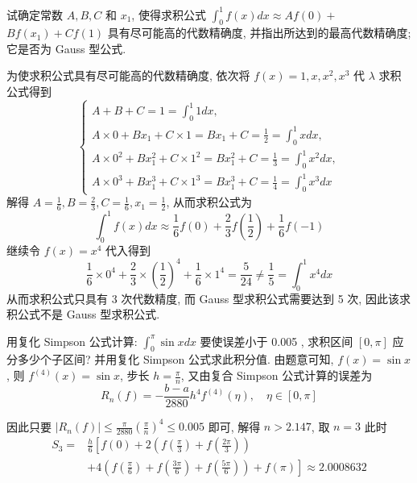  \begin{tcolorbox}[enhanced,colback=10,colframe=9,breakable,coltitle=green!25!black,title=2024]
试确定常数 $ A, B, C $ 和 $ x_{1} $, 使得求积公式 $\displaystyle \int_{0}^{1} f(x) d x \approx A f(0)+ $ $ B f\left(x_{1}\right)+C f(1) $ 具有尽可能高的代数精确度, 并指出所达到的最高代数精确度;它是否为 Gauss 型公式.
\tcblower

 为使求积公式具有尽可能高的代数精确度, 依次将 $ f(x)=1, x, x^{2}, x^{3} $ 代 $ \lambda $ 求积公式得到
$$
\left\{\begin{array}{l}
A+B+C=1=\int_{0}^{1} 1 d x, \\
A \times 0+B x_{1}+C \times 1=B x_{1}+C=\frac{1}{2}=\int_{0}^{1} x d x, \\
A \times 0^{2}+B x_{1}^{2}+C \times 1^{2}=B x_{1}^{2}+C=\frac{1}{3}=\int_{0}^{1} x^{2} d x, \\
A \times 0^{3}+B x_{1}^{3}+C \times 1^{3}=B x_{1}^{3}+C=\frac{1}{4}=\int_{0}^{1} x^{3} d x
\end{array}\right.
$$
解得 $ A=\frac{1}{6}, B=\frac{2}{3}, C=\frac{1}{6}, x_{1}=\frac{1}{2} $, 从而求积公式为
$$
\int_{0}^{1} f(x) d x \approx \frac{1}{6} f(0)+\frac{2}{3} f\left(\frac{1}{2}\right)+\frac{1}{6} f(-1)
$$
继续令 $ f(x)=x^{4} $ 代入得到
$$
\frac{1}{6} \times 0^{4}+\frac{2}{3} \times\left(\frac{1}{2}\right)^{4}+\frac{1}{6} \times 1^{4}=\frac{5}{24} \neq \frac{1}{5}=\int_{0}^{1} x^{4} d x 
$$
从而求积公式只具有 3 次代数精度, 而 Gauss 型求积公式需要达到 5 次, 因此该求积公式不是 Gauss 型求积公式.

\end{tcolorbox}

 
\begin{tcolorbox}[enhanced,colback=10,colframe=9,breakable,coltitle=green!25!black,title=2024]
 用复化 Simpson 公式计算: $\displaystyle \int_{0}^{\pi} \sin x d x $ 要使误差小于 0.005 , 求积区间 $ [0, \pi] $ 应分多少个子区间? 并用复化 Simpson 公式求此积分值.
\tcblower
 由题意可知, $ f(x)=\sin x $, 则 $ f^{(4)}(x)=\sin x $, 步长 $ h=\frac{\pi}{n} $, 又由复合 Simpson 公式计算的误差为
$$
R_{n}(f)=-\frac{b-a}{2880} h^{4} f^{(4)}(\eta), \quad \eta \in[0, \pi]
$$

因此只要 $ \left|R_{n}(f)\right| \leqslant \frac{\pi}{2880}\left(\frac{\pi}{n}\right)^{4} \leqslant 0.005 $ 即可, 解得 $ n>2.147 $, 取 $ n=3 $ 此时
$$
\begin{aligned}
S_{3}= & \frac{h}{6}\left[f(0)+2\left(f\left(\frac{\pi}{3}\right)+f\left(\frac{2 \pi}{3}\right)\right)\right. \\
& \left.+4\left(f\left(\frac{\pi}{6}\right)+f\left(\frac{3 \pi}{6}\right)+f\left(\frac{5 \pi}{6}\right)\right)+f(\pi)\right] \approx 2.0008632
\end{aligned}
$$
\end{tcolorbox}



